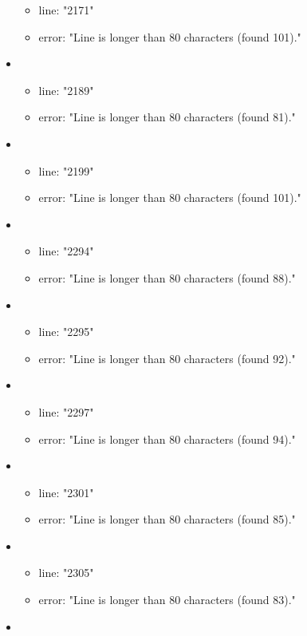 \begin{itemize}
\begin{itemize}
		\item line: "2171" 
		\item error: "Line is longer than 80 characters (found 101)." 
	\end{itemize}
	\item 
	\begin{itemize} 
		\item line: "2189" 
		\item error: "Line is longer than 80 characters (found 81)." 
	\end{itemize}
	\item 
	\begin{itemize} 
		\item line: "2199" 
		\item error: "Line is longer than 80 characters (found 101)." 
	\end{itemize}
	\item 
	\begin{itemize} 
		\item line: "2294" 
		\item error: "Line is longer than 80 characters (found 88)." 
	\end{itemize}
	\item 
	\begin{itemize} 
		\item line: "2295" 
		\item error: "Line is longer than 80 characters (found 92)." 
	\end{itemize}
	\item 
	\begin{itemize} 
		\item line: "2297" 
		\item error: "Line is longer than 80 characters (found 94)." 
	\end{itemize}
	\item 
	\begin{itemize} 
		\item line: "2301" 
		\item error: "Line is longer than 80 characters (found 85)." 
	\end{itemize}
	\item 
	\begin{itemize} 
		\item line: "2305" 
		\item error: "Line is longer than 80 characters (found 83)." 
	\end{itemize}
	\item 
	\begin{itemize} 

\end{itemize}
\end{itemize}
